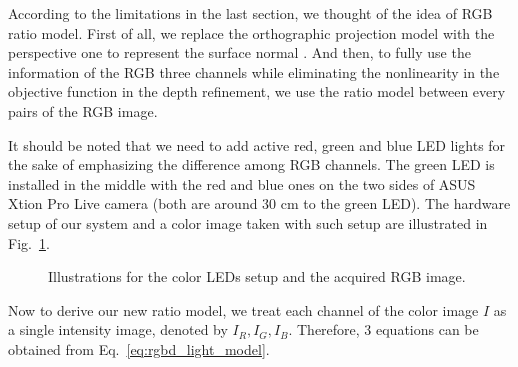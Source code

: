 According to the limitations in the last section, we thought of the idea of RGB ratio model.
First of all, we replace the orthographic projection model with the perspective one to represent the surface normal .
And then, to fully use the information of the RGB three channels while eliminating the nonlinearity in the objective function in the depth refinement, we use the ratio model between every pairs of the RGB image.

It should be noted that we need to add active red, green and blue LED lights for the sake of emphasizing the difference among RGB channels.
The green LED is installed in the middle with the red and blue ones on the two sides of ASUS Xtion Pro Live camera (both are around 30 cm to the green LED).
The hardware setup of our system and a color image taken with such setup are illustrated in Fig.~\ref{fig:ratio_setup}.

\begin{figure}[!htbp]
\centering
{}
\caption{Illustrations for the color LEDs setup and the acquired RGB image.}
\label{fig:ratio_setup}
\end{figure}


Now to derive our new ratio model, we treat each channel of the color image $I$ as a single intensity image, denoted by $I_R, I_G, I_B$.
Therefore, 3 equations can be obtained from Eq.~\ref{eq:rgbd_light_model}.

